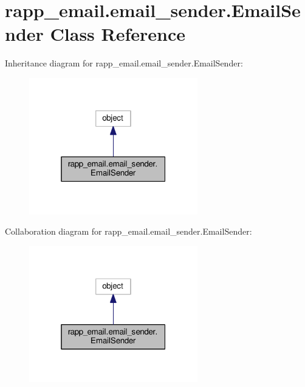 \hypertarget{classrapp__email_1_1email__sender_1_1EmailSender}{\section{rapp\-\_\-email.\-email\-\_\-sender.\-Email\-Sender Class Reference}
\label{classrapp__email_1_1email__sender_1_1EmailSender}
}


Inheritance diagram for rapp\-\_\-email.\-email\-\_\-sender.\-Email\-Sender\-:
\nopagebreak
\begin{figure}[H]
\begin{center}
\leavevmode
\includegraphics[width=208pt]{classrapp__email_1_1email__sender_1_1EmailSender__inherit__graph}
\end{center}
\end{figure}


Collaboration diagram for rapp\-\_\-email.\-email\-\_\-sender.\-Email\-Sender\-:
\nopagebreak
\begin{figure}[H]
\begin{center}
\leavevmode
\includegraphics[width=208pt]{classrapp__email_1_1email__sender_1_1EmailSender__coll__graph}
\end{center}
\end{figure}
